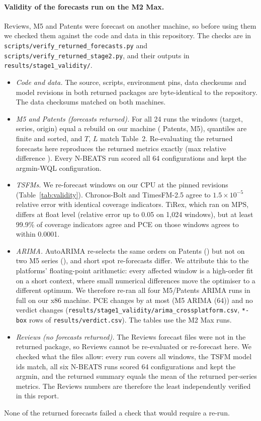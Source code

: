 \paragraph{Validity of the forecasts run on the M2 Max.}\label{sec:validity}
Reviews, M5 and Patents were forecast on another machine, so before using them we checked them against the
code and data in this repository. The checks are in \texttt{scripts/verify\_returned\_forecasts.py} and
\texttt{scripts/verify\_returned\_stage2.py}, and their outputs in \texttt{results/stage1\_validity/}.
\begin{itemize}
\item \emph{Code and data.} The source, scripts, environment pins, data checksums and model revisions in both
returned packages are byte-identical to the repository. The data checksums matched on both machines.
\item \emph{M5 and Patents (forecasts returned).} For all 24 runs the windows (target, series, origin) equal a
rebuild on our machine (\winEqPat{} Patents, \winEqMfive{} M5), quantiles are finite and sorted, and $T$, $L$
match Table~2. Re-evaluating the returned forecasts here reproduces the returned metrics exactly (max relative
difference \reevalMaxDiff). Every N-BEATS run scored all 64 configurations and kept the argmin-WQL configuration.
\item \emph{TSFMs.} We re-forecast windows on our CPU at the pinned revisions (Table~\ref{tab:validity}).
Chronos-Bolt and TimesFM-2.5 agree to $1.5\times10^{-5}$ relative error with identical coverage indicators. TiRex,
which ran on MPS, differs at float level (relative error up to 0.05 on 1{,}024 windows), but at least 99.9\% of coverage
indicators agree and PCE on those windows agrees to within 0.0001.
\item \emph{ARIMA.} AutoARIMA re-selects the same orders on Patents (\arimaOrdersEqPat) but not on two M5 series
(\arimaOrdersEqMfive), and short spot re-forecasts differ. We attribute this to the platforms' floating-point arithmetic:
every affected window is a high-order fit on a short context, where small numerical differences move the
optimiser to a different optimum. We therefore re-ran all four
M5/Patents ARIMA runs in full on our x86 machine. PCE changes by at most \pceBoxDiffArimaMfive{} (M5 ARIMA (64))
and no verdict changes (\texttt{results/stage1\_validity/arima\_crossplatform.csv}, \texttt{*-box} rows of
\texttt{results/verdict.csv}). The tables use the M2 Max runs.
\item \emph{Reviews (no forecasts returned).} The Reviews forecast files were not in the returned package, so
Reviews cannot be re-evaluated or re-forecast here. We checked what the files allow: every run covers all \nwinRev{} windows,
the TSFM model ids match, all six N-BEATS runs scored 64 configurations and kept the argmin, and the returned
summary equals the mean of the returned per-series metrics. The Reviews numbers are therefore the least
independently verified in this report.
\end{itemize}
None of the returned forecasts failed a check that would require a re-run.

